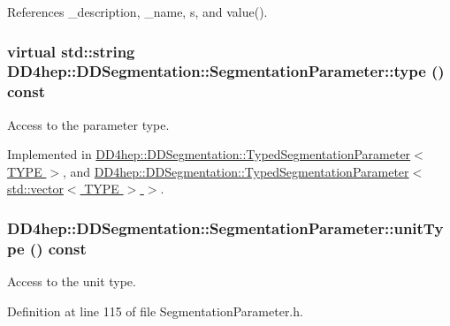 References \_\-description, \_\-name, s, and value().\hypertarget{class_d_d4hep_1_1_d_d_segmentation_1_1_segmentation_parameter_a761f142a3d6d7ecdbc200e97913af165}{
\subsubsection[{type}]{\setlength{\rightskip}{0pt plus 5cm}virtual std::string DD4hep::DDSegmentation::SegmentationParameter::type () const}}
\label{class_d_d4hep_1_1_d_d_segmentation_1_1_segmentation_parameter_a761f142a3d6d7ecdbc200e97913af165}


Access to the parameter type. 

Implemented in \hyperlink{class_d_d4hep_1_1_d_d_segmentation_1_1_typed_segmentation_parameter_a69e362f7662d675f97abf3c12233721d}{DD4hep::DDSegmentation::TypedSegmentationParameter$<$ TYPE $>$}, and \hyperlink{class_d_d4hep_1_1_d_d_segmentation_1_1_typed_segmentation_parameter_3_01std_1_1vector_3_01_t_y_p_e_01_4_01_4_af67d8bae82f853555d805111b1794553}{DD4hep::DDSegmentation::TypedSegmentationParameter$<$ std::vector$<$ TYPE $>$ $>$}.\hypertarget{class_d_d4hep_1_1_d_d_segmentation_1_1_segmentation_parameter_affe99079b9d688d69aefe475cfbc1f39}{
\subsubsection[{unitType}]{ DD4hep::DDSegmentation::SegmentationParameter::unitType () const}}
\label{class_d_d4hep_1_1_d_d_segmentation_1_1_segmentation_parameter_affe99079b9d688d69aefe475cfbc1f39}


Access to the unit type. 

Definition at line 115 of file SegmentationParameter.h.

